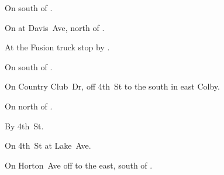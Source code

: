 

\begin{LocationList}

On  south of .

On  at Davis~Ave, north of .

At the Fusion truck stop by  .

On  south of .

On Country Club~Dr, off  4th~St to the south in east Colby.

On  north of .

By  4th~St.

On  4th~St at Lake~Ave.

On Horton~Ave off  to the east, south of .

\end{LocationList}
